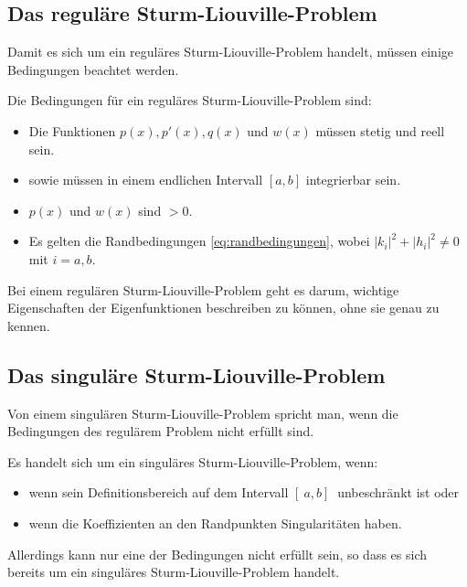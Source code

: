 \subsection{Das reguläre Sturm-Liouville-Problem\label{sub:reguläre_sturm_liouville_problem}}
Damit es sich um ein reguläres Sturm-Liouville-Problem handelt, müssen einige Bedingungen beachtet werden.
\begin{definition}
	\label{def:reguläres_sturm-liouville-problem}
	Die Bedingungen für ein reguläres Sturm-Liouville-Problem sind:
	\begin{itemize}
		\item Die Funktionen $p(x), p'(x), q(x)$ und $w(x)$ müssen stetig und reell sein.
		\item sowie müssen in einem endlichen Intervall $[a,b]$ integrierbar sein.
		\item $p(x)$ und $w(x)$ sind $>0$.
		\item Es gelten die Randbedingungen \ref{eq:randbedingungen}, wobei $|k_i|^2 + |h_i|^2\ne 0$ mit $i=a,b$.
	\end{itemize}
\end{definition}
Bei einem regulären Sturm-Liouville-Problem geht es darum, wichtige Eigenschaften der Eigenfunktionen beschreiben zu können, ohne sie genau zu kennen.


%
%


\subsection{Das singuläre Sturm-Liouville-Problem\label{sub:singuläre_sturm_liouville_problem}}
Von einem singulären Sturm-Liouville-Problem spricht man, wenn die Bedingungen des regulärem Problem nicht erfüllt sind.
\begin{definition}
	\label{def:singulär_sturm-liouville-problem}
Es handelt sich um ein singuläres Sturm-Liouville-Problem, wenn:
	\begin{itemize}
		\item wenn sein Definitionsbereich auf dem Intervall $[ \ a,b] \ $ unbeschränkt ist oder
		\item wenn die Koeffizienten an den Randpunkten Singularitäten haben.
	\end{itemize}
\end{definition}
Allerdings kann nur eine der Bedingungen nicht erfüllt sein, so dass es sich bereits um ein singuläres Sturm-Liouville-Problem handelt.

